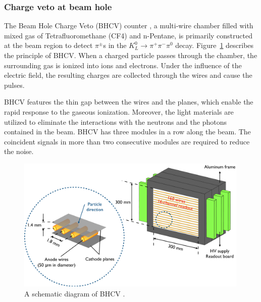 \subsubsection{Charge veto at beam hole}
The Beam Hole Charge Veto (BHCV) counter \parencite{BHCV, BHCV2}, a multi-wire chamber filled with mixed gas of Tetrafluoromethane (CF4) and n-Pentane, is primarily constructed at the beam region to detect $\pi^{\pm}$s in the ${K_L^0 \to \pi^+ \pi^- \pi^0}$ decay. Figure~\ref{fig:BHCV} describes the principle of BHCV. When a charged particle passes through the chamber, the surrounding gas is ionized into ions and electrons. Under the influence of the electric field, the resulting charges are collected through the wires and cause the pulses. 

BHCV features the thin gap between the wires and the planes, which enable the rapid response to the gaseous ionization. Moreover, the light materials are utilized to eliminate the interactions with the neutrons and the photons contained in the beam. BHCV has three modules in a row along the beam. The coincident signals in more than two consecutive modules are required to reduce the noise.

\begin{figure}[h]
\begin{center}
\captionsetup{width=.99\linewidth}
\includegraphics[width=0.99\textwidth]{Figures/Chapter3/BHCV.pdf}
\caption{A schematic diagram of BHCV \parencite{BHCV}.}
\label{fig:BHCV}
\end{center}
\end{figure}




